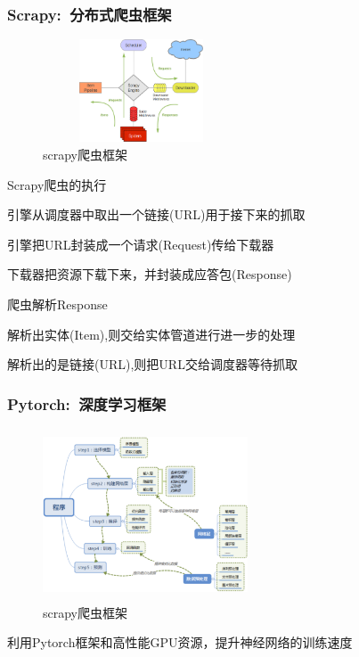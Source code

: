 \begin{frame}
	\frametitle{\textrm{Scrapy}:~分布式爬虫框架}
\begin{figure}[h!]
\centering
\vskip -8pt
\includegraphics[height=1.20in,width=2.30in,viewport=0 0 115 90,clip]{Figures/KG_Chem-Scrapy.png}
\caption{\tiny \textrm{scrapy}爬虫框架}%
\label{Fig:KG_Chem-scrapy}
\end{figure}
\textrm{Scrapy}爬虫的执行
\begin{itemize}
 {\fontsize{7.5pt}{6.0pt}\selectfont
	\item 引擎从调度器中取出一个链接\textrm{(URL)}用于接下来的抓取
	\item 引擎把\textrm{URL}封装成一个请求\textrm{(Request)}传给下载器
	\item 下载器把资源下载下来，并封装成应答包\textrm{(Response)}
	\item 爬虫解析\textrm{Response}
	\item 解析出实体\textrm{(Item)},则交给实体管道进行进一步的处理
	\item 解析出的是链接\textrm{(URL)},则把\textrm{URL}交给调度器等待抓取}
\end{itemize}
\end{frame}

\begin{frame}
	\frametitle{\textrm{Pytorch}:~深度学习框架}
\begin{figure}[h!]
\centering
\vskip -8pt
\includegraphics[height=2.00in,width=2.40in,viewport=0 0 110 80,clip]{Figures/KG_Chem-Pytorch.png}
\caption{\tiny \textrm{scrapy}爬虫框架}%
\label{Fig:KG_Chem-Pytorch}
\end{figure}
利用\textrm{Pytorch}框架和高性能\textrm{GPU}资源，提升神经网络的训练速度
\end{frame}


